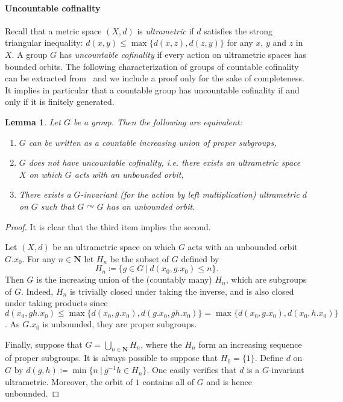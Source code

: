 \documentclass[a4paper]{article}
\newtheorem{lem}{Lemma}[section]
\theoremstyle{definition}
\newtheorem{exmp}[lem]{Example}
\newcommand*{\field}[1]{\mathbf{#1}}
\newcommand*{\N}{\field{N}}
\newcommand{\setst}[2]{\{#1\ |\ #2\}}
\begin{document}
\paragraph{Uncountable cofinality}
Recall that a metric space $(X,d)$ is \emph{ultrametric} if $d$ satisfies the strong triangular inequality: $d(x,y)\leq\max\{d(x,z),d(z,y)\}$ for any $x$, $y$ and $z$ in $X$.
A group $G$ has \emph{uncountable cofinality} if every action on ultrametric spaces has bounded orbits.
The following characterization of groups of countable cofinality can be extracted from~\cite{MR2240370} and we include a proof only for the sake of completeness.
It implies in particular that a countable group has uncountable cofinality if and only if it is finitely generated.
%
%
\begin{lem}\label{Lemma:CofSub}
Let $G$ be a group. Then the following are equivalent:
\begin{enumerate}
\item $G$ can be written as a countable increasing union of proper subgroups,
\item $G$ does not have uncountable cofinality, i.e. there exists an ultrametric space $X$ on which $G$ acts with an unbounded orbit,
\item There exists a $G$-invariant (for the action by left multiplication) ultrametric $d$ on $G$ such that $G\curvearrowright G$ has an unbounded orbit.
\end{enumerate}
\end{lem}
\begin{proof}
It is clear that the third item implies the second.

Let $(X,d)$ be an ultrametric space on which $G$ acts with an unbounded orbit~$G.x_0$. For any $n\in \N$ let $H_n$ be the subset of $G$ defined by
\[
	H_n\coloneqq\setst{g\in G}{d(x_0,g.x_0)\leq n}.
\]
Then $G$ is the increasing union of the (countably many) $H_n$, which are subgroups of $G$.
Indeed, $H_n$ is trivially closed under taking the inverse, and is also closed under taking products since $d(x_0,gh.x_0)\leq\max\{d(x_0,g.x_0),d(g.x_0,gh.x_0)\}=\max\{d(x_0,g.x_0),d(x_0,h.x_0)\}$.
As $G.x_0$ is unbounded, they are proper subgroups.

Finally, suppose that $G=\bigcup_{n\in \N}H_n$, where the $H_n$ form an increasing sequence of proper subgroups.
It is always possible to suppose that $H_0=\{1\}$.
Define $d$ on $G$ by $d(g,h)\coloneqq\min\setst{n}{g^{-1}h\in H_n}$.
One easily verifies that $d$ is a $G$-invariant ultrametric. Moreover, the orbit of $1$ contains all of $G$ and is hence unbounded.
\end{proof}
%
%
%
%
%
%
%
\end{document}
